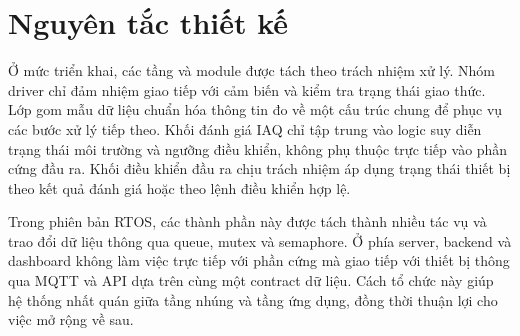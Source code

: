 \section{Nguyên tắc thiết kế}

Ở mức triển khai, các tầng và module được tách theo trách nhiệm xử lý. Nhóm driver chỉ
đảm nhiệm giao tiếp với cảm biến và kiểm tra trạng thái giao thức. Lớp gom mẫu dữ liệu
chuẩn hóa thông tin đo về một cấu trúc chung để phục vụ các bước xử lý tiếp theo. Khối
đánh giá IAQ chỉ tập trung vào logic suy diễn trạng thái môi trường và ngưỡng điều
khiển, không phụ thuộc trực tiếp vào phần cứng đầu ra. Khối điều khiển đầu ra chịu trách
nhiệm áp dụng trạng thái thiết bị theo kết quả đánh giá hoặc theo lệnh điều khiển hợp
lệ.

Trong phiên bản RTOS, các thành phần này được tách thành nhiều tác vụ và trao đổi dữ
liệu thông qua queue, mutex và semaphore. Ở phía server, backend và dashboard không làm
việc trực tiếp với phần cứng mà giao tiếp với thiết bị thông qua MQTT và API dựa trên
cùng một contract dữ liệu. Cách tổ chức này giúp hệ thống nhất quán giữa tầng nhúng và
tầng ứng dụng, đồng thời thuận lợi cho việc mở rộng về sau.
